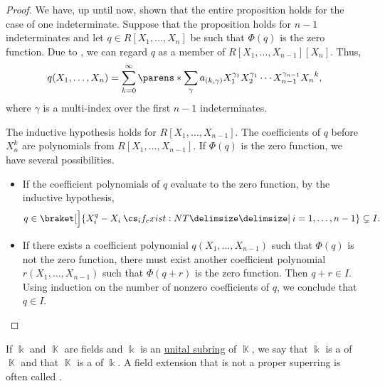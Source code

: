 \begin{proof}
  We have, up until now, shown that the entire proposition holds for the case of one indeterminate. Suppose that the proposition holds for \( n - 1 \) indeterminates and let \( q \in R[X_1, \ldots, X_n] \) be such that \( \Phi(q) \) is the zero function. Due to , we can regard \( q \) as a member of \( R[X_1, \ldots, X_{n-1}][X_n] \). Thus,
  \begin{equation*}
    q(X_1, \ldots, X_n) = \sum_{k=0}^\infty \parens*{ \sum_\gamma a_{(k,\gamma)} X_1^{\gamma_1} X_2^{\gamma_1} \cdots X_{n-1}^{\gamma_{n-1}} } {X_n}^k,
  \end{equation*}
  where \( \gamma \) is a multi-index over the first \( n - 1 \) indeterminates.

  The inductive hypothesis holds for \( R[X_1, \ldots, X_{n-1}] \). The coefficients of \( q \) before \( X_n^k \) are polynomials from \( R[X_1, \ldots, X_{n-1}] \). If \( \Phi(q) \) is the zero function, we have several possibilities.
  \begin{itemize}
    \item If the coefficient polynomials of \( q \) evaluate to the zero function, by the inductive hypothesis,
    \begin{equation*}
      q \in \braket[\Big]{ X_i^q - X_i \given* i = 1, \ldots, n - 1 } \subsetneq I.
    \end{equation*}

    \item If there exists a coefficient polynomial \( q(X_1, \ldots, X_{n-1}) \) such that \( \Phi(q) \) is not the zero function, there must exist another coefficient polynomial \( r(X_1, \ldots, X_{n-1}) \) such that \( \Phi(q + r) \) is the zero function. Then \( q + r \in I \). Using induction on the number of nonzero coefficients of \( q \), we conclude that \( q \in I \).
  \end{itemize}
\end{proof}

\begin{definition}\label{def:field_extension}
  If \( \Bbbk \) and \( \BbbK \) are fields and \( \Bbbk \) is an \hyperref[def:ring/submodel]{unital subring} of \( \BbbK \), we say that \( \Bbbk \) is a  of \( \BbbK \) and that \( \BbbK \) is a  of \( \Bbbk \). A field extension that is not a proper superring is often called .
\end{definition}

